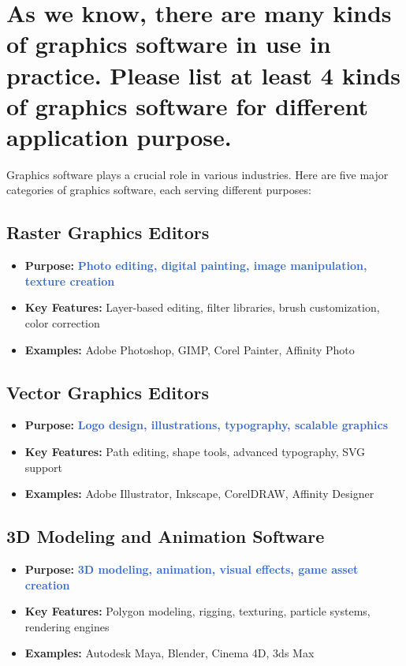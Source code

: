 \documentclass[12pt]{article}
\begin{document}

\section{As we know, there are many kinds of graphics software in use in practice. Please list at least 4 kinds of graphics software for different application purpose.}\label{sec:3}

Graphics software plays a crucial role in various industries. Here are five major categories of graphics software, each serving different purposes:

\subsection{Raster Graphics Editors}
\begin{itemize}
    \item \textbf{Purpose:} \textcolor{highlight}{\textbf{Photo editing, digital painting, image manipulation, texture creation}}
    \item \textbf{Key Features:} Layer-based editing, filter libraries, brush customization, color correction
    \item \textbf{Examples:} Adobe Photoshop, GIMP, Corel Painter, Affinity Photo
\end{itemize}

\subsection{Vector Graphics Editors}
\begin{itemize}
    \item \textbf{Purpose:} \textcolor{highlight}{\textbf{Logo design, illustrations, typography, scalable graphics}}
    \item \textbf{Key Features:} Path editing, shape tools, advanced typography, SVG support
    \item \textbf{Examples:} Adobe Illustrator, Inkscape, CorelDRAW, Affinity Designer
\end{itemize}

\subsection{3D Modeling and Animation Software}
\begin{itemize}
    \item \textbf{Purpose:} \textcolor{highlight}{\textbf{3D modeling, animation, visual effects, game asset creation}}
    \item \textbf{Key Features:} Polygon modeling, rigging, texturing, particle systems, rendering engines
    \item \textbf{Examples:} Autodesk Maya, Blender, Cinema 4D, 3ds Max
\end{itemize}
\end{document}
